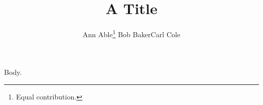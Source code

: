 \documentclass{article}
\title{A Title}
\author{Ann Able\thanks{Equal contribution.} \quad Bob Baker\footnotemark[1] \quad Carl Cole}
\begin{document}
\maketitle Body.
\end{document}
